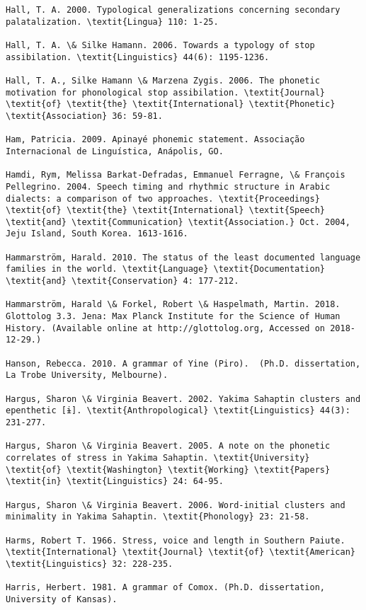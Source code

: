 \begin{verbatim}
Hall, T. A. 2000. Typological generalizations concerning secondary palatalization. \textit{Lingua} 110: 1-25.

Hall, T. A. \& Silke Hamann. 2006. Towards a typology of stop assibilation. \textit{Linguistics} 44(6): 1195-1236.

Hall, T. A., Silke Hamann \& Marzena Zygis. 2006. The phonetic motivation for phonological stop assibilation. \textit{Journal} \textit{of} \textit{the} \textit{International} \textit{Phonetic} \textit{Association} 36: 59-81.

Ham, Patricia. 2009. Apinayé phonemic statement. Associação Internacional de Linguística, Anápolis, GO.

Hamdi, Rym, Melissa Barkat-Defradas, Emmanuel Ferragne, \& François Pellegrino. 2004. Speech timing and rhythmic structure in Arabic dialects: a comparison of two approaches. \textit{Proceedings} \textit{of} \textit{the} \textit{International} \textit{Speech} \textit{and} \textit{Communication} \textit{Association.} Oct. 2004, Jeju Island, South Korea. 1613-1616.

Hammarström, Harald. 2010. The status of the least documented language families in the world. \textit{Language} \textit{Documentation} \textit{and} \textit{Conservation} 4: 177-212.

Hammarström, Harald \& Forkel, Robert \& Haspelmath, Martin. 2018. Glottolog 3.3. Jena: Max Planck Institute for the Science of Human History. (Available online at http://glottolog.org, Accessed on 2018-12-29.)

Hanson, Rebecca. 2010. A grammar of Yine (Piro).  (Ph.D. dissertation, La Trobe University, Melbourne).

Hargus, Sharon \& Virginia Beavert. 2002. Yakima Sahaptin clusters and epenthetic [ɨ]. \textit{Anthropological} \textit{Linguistics} 44(3): 231-277.

Hargus, Sharon \& Virginia Beavert. 2005. A note on the phonetic correlates of stress in Yakima Sahaptin. \textit{University} \textit{of} \textit{Washington} \textit{Working} \textit{Papers} \textit{in} \textit{Linguistics} 24: 64-95.

Hargus, Sharon \& Virginia Beavert. 2006. Word-initial clusters and minimality in Yakima Sahaptin. \textit{Phonology} 23: 21-58.

Harms, Robert T. 1966. Stress, voice and length in Southern Paiute. \textit{International} \textit{Journal} \textit{of} \textit{American} \textit{Linguistics} 32: 228-235.

Harris, Herbert. 1981. A grammar of Comox. (Ph.D. dissertation, University of Kansas).


\end{verbatim}
